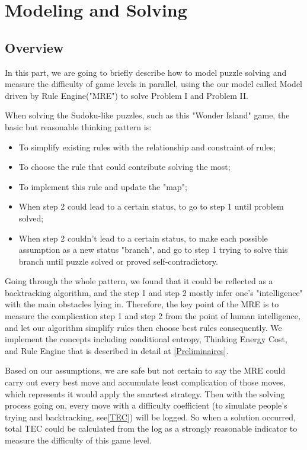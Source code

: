 \section{Modeling and Solving}

\subsection{Overview}\label{ModelOverview}

In this part, we are going to briefly describe how to model puzzle solving and measure the difficulty of game levels in parallel, using the our model called Model driven by Rule Engine("MRE") to solve Problem I and Problem II.

When solving the Sudoku-like puzzles, such as this "Wonder Island" game, the basic but reasonable thinking pattern is:

\begin{itemize}
  \item To simplify existing rules with the relationship and constraint of rules;
  \item To choose the rule that could contribute solving the most;
  \item To implement this rule and update the "map";
  \item When step 2 could lead to a certain status, to go to step 1 until problem solved;
  \item When step 2 couldn't lead to a certain status, to make each possible assumption as a new status "branch", and go to step 1 trying to solve this branch until puzzle solved or proved self-contradictory.
\end{itemize}

Going through the whole pattern, we found that it could be reflected as a backtracking algorithm, and the step 1 and step 2 mostly infer one's "intelligence" with the main obstacles lying in. Therefore, the key point of the MRE is to measure the complication step 1 and step 2 from the point of human intelligence, and let our algorithm simplify rules then choose best rules consequently. We implement the concepts including conditional entropy, Thinking Energy Cost, and Rule Engine that is described in detail at \ref{Preliminaires}.

Based on our assumptions, we are safe but not certain to say the MRE could carry out every best move and accumulate least complication of those moves, which represents it would apply the smartest strategy. Then with the solving process going on, every move with a difficulty coefficient (to simulate people's trying and backtracking, see\ref{TEC}) will be logged. So when a solution occurred, total TEC could be calculated from the log as a strongly reasonable indicator to measure the difficulty of this game level.

